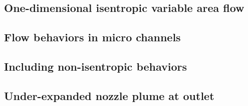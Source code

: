 \subsection{One-dimensional isentropic variable area flow}\label{sec:one-dim-isentropic}
	
	\newpage

\subsection{Flow behaviors in micro channels}\label{sec:micro-channels}
	
	\newpage

\subsection{Including non-isentropic behaviors}\label{sec:disconnected-reservoirs}
	
	\newpage

\subsection{Under-expanded nozzle plume at outlet}\label{sec:outlet_plume}
	
	\newpage
